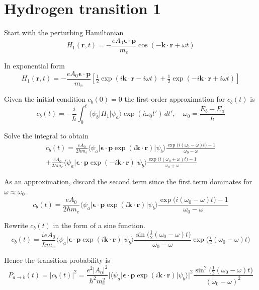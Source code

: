 

\section*{Hydrogen transition 1}

Start with the perturbing Hamiltonian
\begin{equation*}
H_1(\mathbf r,t)=-\frac{eA_0\boldsymbol{\epsilon}\cdot\mathbf p}{m_e}
\cos(-\mathbf k\cdot\mathbf r+\omega t)
\end{equation*}

In exponential form
\begin{equation*}
H_1(\mathbf r,t)=-\frac{eA_0\boldsymbol{\epsilon}\cdot\mathbf p}{m_e}
\left[\tfrac{1}{2}\exp(i\mathbf k\cdot\mathbf r-i\omega t)
+\tfrac{1}{2}\exp(-i\mathbf k\cdot\mathbf r+i\omega t)\right]
\end{equation*}

Given the initial condition $c_b(0)=0$ the first-order approximation for $c_b(t)$ is
\begin{equation*}
c_b(t)=-\frac{i}{\hbar}\int_0^t
\langle\psi_b|H_1|\psi_a\rangle\exp(i\omega_0t')\,dt',\quad
\omega_0=\frac{E_b-E_a}{\hbar}
\end{equation*}

Solve the integral to obtain
\begin{multline*}
c_b(t)=\frac{eA_0}{2\hbar m_e}
\langle\psi_a|\boldsymbol{\epsilon}\cdot\mathbf p\exp(i\mathbf k\cdot\mathbf r)|\psi_b\rangle
\frac{\exp\bigl(i(\omega_0-\omega)t\bigr)-1}{\omega_0-\omega}
\\
+\frac{eA_0}{2\hbar m_e}
\langle\psi_a|\boldsymbol{\epsilon}\cdot\mathbf p\exp(-i\mathbf k\cdot\mathbf r)|\psi_b\rangle
\frac{\exp\bigl(i(\omega_0+\omega)t\bigr)-1}{\omega_0+\omega}
\tag{1}
\end{multline*}

As an approximation, discard the second term since the first term
dominates for $\omega\approx\omega_0$.
\begin{equation*}
c_b(t)=\frac{eA_0}{2\hbar m_e}
\langle\psi_a|\boldsymbol{\epsilon}\cdot\mathbf p\exp(i\mathbf k\cdot\mathbf r)|\psi_b\rangle
\frac{\exp\bigl(i(\omega_0-\omega)t\bigr)-1}{\omega_0-\omega}
\end{equation*}

Rewrite $c_b(t)$ in the form of a sine function.
\begin{equation*}
c_b(t)=\frac{ieA_0}{\hbar m_e}
\langle\psi_a|\boldsymbol{\epsilon}\cdot\mathbf p\exp(i\mathbf k\cdot\mathbf r)|\psi_b\rangle
\frac{\sin\bigl(\tfrac{1}{2}(\omega_0-\omega)t\bigr)}{\omega_0-\omega}
\exp\bigl(\tfrac{i}{2}(\omega_0-\omega)t\bigr)
\tag{2}
\end{equation*}

Hence the transition probability is
\begin{equation*}
P_{a\rightarrow b}(t)=|c_b(t)|^2=\frac{e^2|A_0|^2}{\hbar^2m_e^2}
\bigl|\langle\psi_a|\boldsymbol{\epsilon}\cdot\mathbf p\exp(i\mathbf k\cdot\mathbf r)|\psi_b\rangle\bigr|^2
\frac{\sin^2\bigl(\tfrac{1}{2}(\omega_0-\omega)t\bigr)}{(\omega_0-\omega)^2}
\end{equation*}


